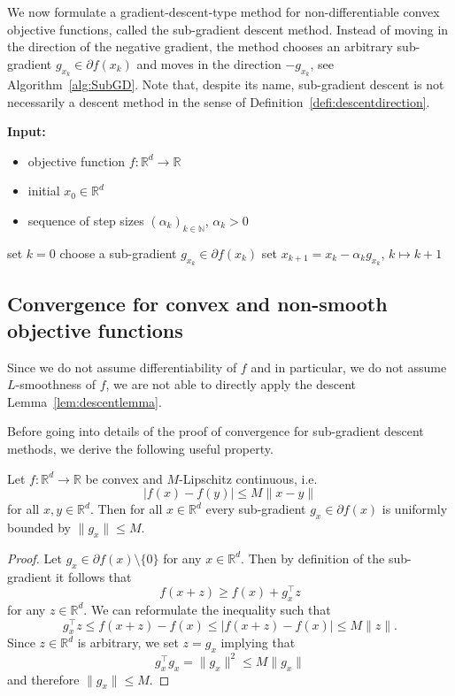 \documentclass[12pt,openany]{book}
\theoremstyle{definition}
\theoremstyle{definition}
\newcommand{\N}{\mathbb{N}}
\newcommand{\R}{\mathbb{R}}
\begin{document}
We now formulate a gradient-descent-type method for non-differentiable convex objective functions, called the sub-gradient descent method. Instead of moving in the direction of the negative gradient, the method chooses an arbitrary sub-gradient $g_{x_k}\in\partial f(x_k)$ and moves in the direction $-g_{x_k}$, see Algorithm~\ref{alg:SubGD}. Note that, despite its name, sub-gradient descent is not necessarily a descent method in the sense of Definition~\eqref{defi:descentdirection}.


\begin{algorithm}[htb!]
\begin{algorithmic}[1]
\State \textbf{Input:} \begin{itemize}
 \item objective function $f:\R^d\to\R$
 \item initial $x_0\in\R^d$
 \item sequence of step sizes $(\alpha_k)_{k\in\N}$, $\alpha_k>0$
 \end{itemize}
 \State set $k=0$
	\State choose a sub-gradient $g_{x_k}\in\partial f(x_k)$
	\State set $x_{k+1} = x_k -\alpha_k g_{x_k}$, $k \mapsto k+1$
\EndWhile
\end{algorithmic}
 \caption{Sub-gradient descent method}\label{alg:SubGD}
\end{algorithm}


\subsection{Convergence for convex and non-smooth objective functions}
Since we do not assume differentiability of $f$ and in particular, we do not assume $L$-smoothness of $f$, we are not able to directly apply the descent Lemma~\ref{lem:descentlemma}.

Before going into details of the proof of convergence for sub-gradient descent methods, we derive the following useful property. 
\begin{lemma}\label{lem:bounded_subG}
Let $f:\R^d\to\R$ be convex and $M$-Lipschitz continuous, i.e.~
\[ |f(x)-f(y)|\le M\|x-y\|\]
for all $x,y\in\R^d$. Then for all $x\in\R^d$ every sub-gradient $g_x\in\partial f(x)$ is uniformly bounded by
$\|g_x\|\le M$.
\end{lemma}
\begin{proof}
Let $g_x\in\partial f(x)\setminus\{0\}$ for any $x\in\R^d$. Then by definition of the sub-gradient it follows that 
\[f(x+z) \ge f(x)+g_x^\top z\]
for any $z\in\R^d$. We can reformulate the inequality such that
\[g_x^\top z \le f(x+z)-f(x) \le |f(x+z)-f(x)|\le M\|z\|. \]
Since $z\in\R^d$ is arbitrary, we set $z=g_x$ implying that
\[g_x^\top g_x = \|g_x\|^2 \le M\|g_x\|\]
and therefore $\|g_x\|\le M$.
\end{proof}
\end{document}
